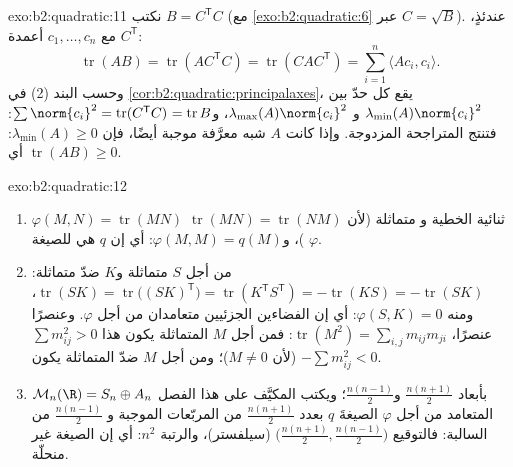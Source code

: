 \begin{solution}{exo:b2:quadratic:11}
نكتب $B = C^{\mathsf T}C$ (مع \cref{exo:b2:quadratic:6} عبر $C =
\sqrt B$). عندئذٍ، مع $c_1, \dots, c_n$ أعمدة
$C^{\mathsf T}$:
\[
\operatorname{tr}(AB) = \operatorname{tr}(AC^{\mathsf T}C)
= \operatorname{tr}(CAC^{\mathsf T})
= \sum_{i=1}^n \langle A c_i, c_i\rangle .
\]
وحسب البند (2) في \cref{cor:b2:quadratic:principalaxes}، يقع كل حدّ
بين $\lambda_{\min}(A)\norm{c_i}^2$ و
$\lambda_{\max}(A)\norm{c_i}^2$، و$\sum\norm{c_i}^2 =
\operatorname{tr}(C^{\mathsf T}C)^{\vphantom1} =
\operatorname{tr} B$: فتنتج المتراجحة المزدوجة. وإذا كانت $A$
شبه معرَّفة موجبة أيضًا، فإن $\lambda_{\min}(A) \geq 0$:
أي $\operatorname{tr}(AB) \geq 0$.
\end{solution}

\begin{solution}{exo:b2:quadratic:12}
\begin{enumerate}
  \item $\varphi(M, N) = \operatorname{tr}(MN)$ ثنائية الخطية و
        متماثلة (لأن $\operatorname{tr}(MN) =
        \operatorname{tr}(NM)$)، و$\varphi(M, M) = q(M)$:
        أي إن $q$ هي  للصيغة $\varphi$.
  \item من أجل $S$ متماثلة و$K$ ضدّ متماثلة:
        $\operatorname{tr}(SK) =
        \operatorname{tr}\bigl((SK)^{\mathsf T}\bigr) =
        \operatorname{tr}(K^{\mathsf T}S^{\mathsf T}) =
        -\operatorname{tr}(KS) = -\operatorname{tr}(SK)$، ومنه
        $\varphi(S, K) = 0$: أي إن الفضاءين الجزئيين
        متعامدان من أجل $\varphi$. وعنصرًا عنصرًا، $\operatorname{tr}
        (M^2) = \sum_{i,j} m_{ij}m_{ji}$: فمن أجل $M$ المتماثلة
        يكون هذا $\sum m_{ij}^2 > 0$ (لأن $M \neq 0$)؛ ومن أجل
        $M$ ضدّ المتماثلة يكون $-\sum m_{ij}^2 < 0$.
  \item $\mathcal M_n(\R) = S_n \oplus A_n$ بأبعاد
        $\frac{n(n+1)}2$ و$\frac{n(n-1)}2$؛ ويكتب 
        المكيَّف على هذا الفصل المتعامد من أجل $\varphi$
        الصيغةَ $q$ بعدد $\frac{n(n+1)}2$ من المربّعات الموجبة و
        $\frac{n(n-1)}2$ من السالبة: فالتوقيع
        $\bigl(\frac{n(n+1)}2, \frac{n(n-1)}2\bigr)$
        (سيلفستر)، والرتبة $n^2$: أي إن الصيغة غير منحلّة.
\end{enumerate}
\end{solution}

